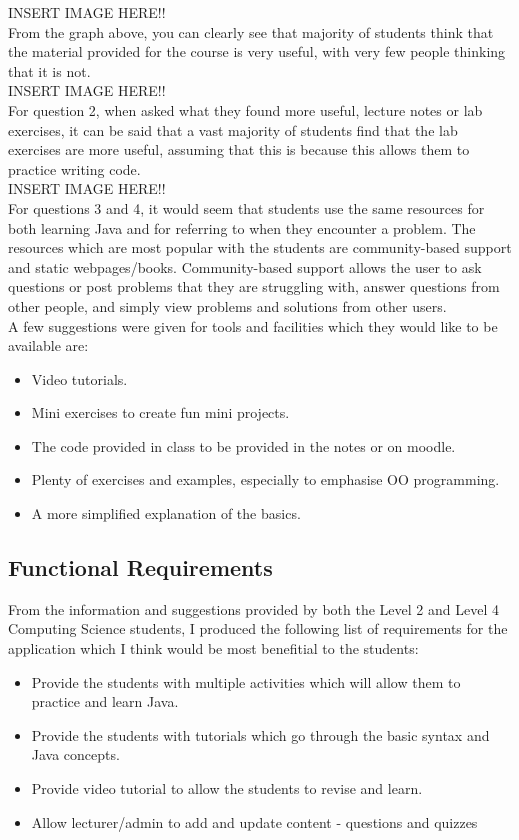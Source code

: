 \documentclass{article}
\begin{document}
INSERT IMAGE HERE!!\\

From the graph above, you can clearly see that majority of students think that the material provided for the course is very useful, with very few people thinking that it is not.\\

INSERT IMAGE HERE!!\\

For question 2, when asked what they found more useful, lecture notes or lab exercises, it can be said that a vast majority of students find that the lab exercises are more useful, assuming that this is because this allows them to practice writing code.\\

INSERT IMAGE HERE!!\\

For questions 3 and 4, it would seem that students use the same resources for both learning Java and for referring to when they encounter a problem. The resources which are most popular with the students are community-based support and static webpages/books. Community-based support allows the user to ask questions or post problems that they are struggling with, answer questions from other people, and simply view problems and solutions from other users.\\

A few suggestions were given for tools and facilities which they would like to be available are:

\begin{itemize}
\item Video tutorials.
\item Mini exercises to create fun mini projects.
\item The code provided in class to be provided in the notes or on moodle.
\item Plenty of exercises and examples, especially to emphasise OO programming.
\item A more simplified explanation of the basics.
\end{itemize}

\subsection{Functional Requirements}

From the information and suggestions provided by both the Level 2 and Level 4 Computing Science students, I produced the following list of requirements for the application which I think would be most benefitial to the students:

\begin{itemize}
\item Provide the students with multiple activities which will allow them to practice and learn Java.
\item Provide the students with tutorials which go through the basic syntax and Java concepts.
\item Provide video tutorial to allow the students to revise and learn.
\item Allow lecturer/admin to add and update content - questions and quizzes
\end{itemize}
\end{document}
